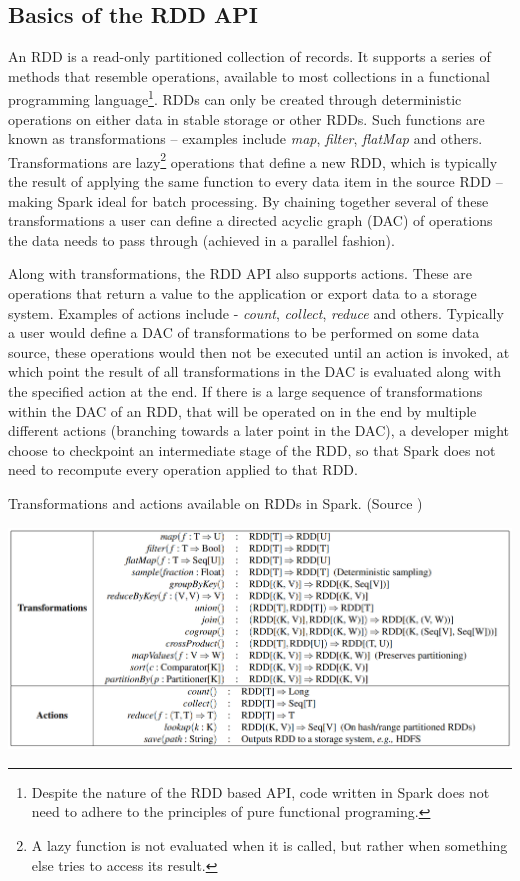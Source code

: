 \documentclass{l4proj}
\begin{document}
\subsection{Basics of the RDD API}

An RDD is a read-only partitioned collection of records. It supports a series of methods that resemble operations, available to most collections in a functional programming language\footnote{Despite the nature of the RDD based API, code written in Spark does not need to adhere to the principles of pure functional programing.}. RDDs can only be created through deterministic operations on either data in stable storage or other RDDs. Such functions are known as transformations -- examples include \textit{map}, \textit{filter}, \textit{flatMap} and others. Transformations are lazy\footnote{A lazy function is not evaluated when it is called, but rather when something else tries to access its result.} operations that define a new RDD, which is typically the result of applying the same function to every data item in the source RDD -- making Spark ideal for batch processing. By chaining together several of these transformations a user can define a directed acyclic graph (DAC) of operations the data needs to pass through (achieved in a parallel fashion).

Along with transformations, the RDD API also supports actions. These are operations that return a value to the application or export data to a storage system. Examples of actions include - \textit{count}, \textit{collect}, \textit{reduce} and others. Typically a user would define a DAC of transformations to be performed on some data source, these operations would then not be executed until an action is invoked, at which point the result of all transformations in the DAC is evaluated along with the specified action at the end. If there is a large sequence of transformations within the DAC of an RDD, that will be operated on in the end by multiple different actions (branching towards a later point in the DAC), a developer might choose to checkpoint an intermediate stage of the RDD, so that Spark does not need to recompute every operation applied to that RDD.

\begin{table}[H]
\caption{Transformations and actions available on RDDs in Spark. (Source \cite{RDD})}
\includegraphics[width=1.0\textwidth]{images/spark-trans-action}
\label{Actions and Transformations}
\end{table}
\end{document}
